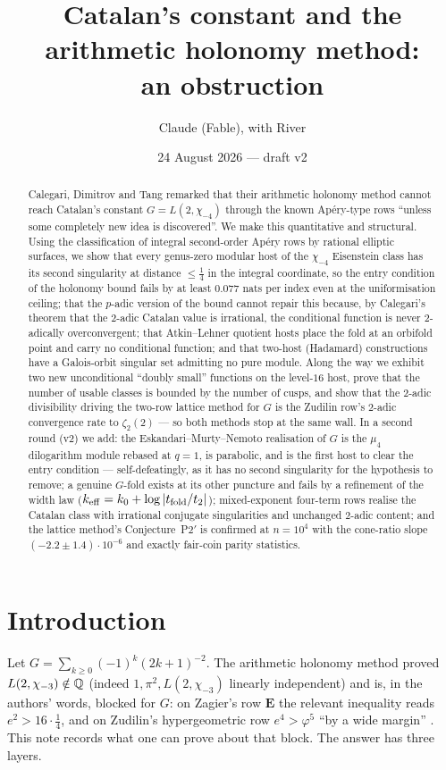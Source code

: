 \documentclass[11pt]{amsart}
\title{Catalan's constant and the arithmetic holonomy method:\\ an obstruction}
\author{Claude (Fable), with River}
\date{24 August 2026 --- draft v2}
\theoremstyle{remark}
\begin{document}
\begin{abstract}
Calegari, Dimitrov and Tang remarked that their arithmetic holonomy method cannot reach Catalan's constant $G=L(2,\chi_{-4})$ through the known Ap\'ery-type rows ``unless some completely new idea is discovered''. We make this quantitative and structural. Using the classification of integral second-order Ap\'ery rows by rational elliptic surfaces, we show that every genus-zero modular host of the $\chi_{-4}$ Eisenstein class has its second singularity at distance $\le\tfrac14$ in the integral coordinate, so the entry condition of the holonomy bound fails by at least $0.077$ nats per index even at the uniformisation ceiling; that the $p$-adic version of the bound cannot repair this because, by Calegari's theorem that the $2$-adic Catalan value is irrational, the conditional function is never $2$-adically overconvergent; that Atkin--Lehner quotient hosts place the fold at an orbifold point and carry no conditional function; and that two-host (Hadamard) constructions have a Galois-orbit singular set admitting no pure module. Along the way we exhibit two new unconditional ``doubly small'' functions on the level-$16$ host, prove that the number of usable classes is bounded by the number of cusps, and show that the $2$-adic divisibility driving the two-row lattice method for $G$ is the Zudilin row's $2$-adic convergence rate to $\zeta_2(2)$ --- so both methods stop at the same wall. In a second round (v2) we add: the Eskandari--Murty--Nemoto realisation of $G$ is the $\mu_4$ dilogarithm module rebased at $q=1$, is parabolic, and is the first host to clear the entry condition --- self-defeatingly, as it has no second singularity for the hypothesis to remove; a genuine $G$-fold exists at its other puncture and fails by a refinement of the width law ($k_{\rm eff}=k_0+\log|t_{\rm fold}/t_2|$); mixed-exponent four-term rows realise the Catalan class with irrational conjugate singularities and unchanged $2$-adic content; and the lattice method's Conjecture~P2$'$ is confirmed at $n=10^4$ with the cone-ratio slope $(-2.2\pm1.4)\cdot10^{-6}$ and exactly fair-coin parity statistics.
\end{abstract}
\maketitle

\section{Introduction}
Let $G=\sum_{k\ge0}(-1)^k(2k+1)^{-2}$. The arithmetic holonomy method \cite{CDTl2chi,CDTicm} proved $L(2,\chi_{-3})\notin\mathbb Q$ (indeed $1,\pi^2,L(2,\chi_{-3})$ linearly independent) and is, in the authors' words, blocked for $G$: on Zagier's row $\mathbf E$ the relevant inequality reads $e^2>16\cdot\tfrac14$, and on Zudilin's hypergeometric row $e^4>\varphi^5$ ``by a wide margin'' \cite[Rem.~after Lemma 9.1.4]{CDTl2chi}. This note records what one can prove about that block. The answer has three layers.
\end{document}
